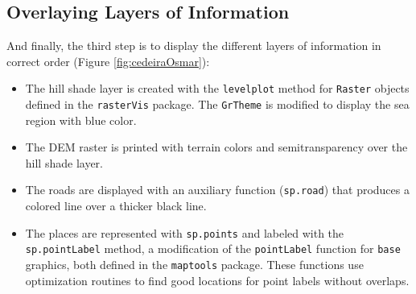 \documentclass[smallroyalvopaper]{memoir}
\begin{document}
\subsection{Overlaying Layers of Information}
\label{sec-1-3}
And finally, the third step is to display the different layers of
information in correct order (Figure \ref{fig:cedeiraOsmar}):

\begin{itemize}
\item The hill shade layer is created with the \texttt{levelplot} method for
  \texttt{Raster} objects defined in the \texttt{rasterVis} package. The
  \texttt{GrTheme} is modified to display the sea region with blue color.

\item The DEM raster is printed with terrain colors and
semitransparency over the hill shade layer.

\item The roads are displayed with an auxiliary function (\texttt{sp.road})
that produces a colored line over a thicker black line.

\item The places are represented with \texttt{sp.points} and labeled with
the \texttt{sp.pointLabel} method, a modification of the \texttt{pointLabel}
function for \texttt{base} graphics, both defined in the \texttt{maptools}
package. These functions use optimization routines to find good
locations for point labels without overlaps.
\end{itemize}

\end{document}
